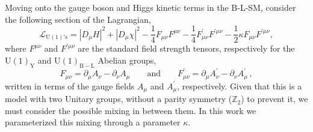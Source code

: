 \documentclass[10pt]{report}
\newcommand{\U}[1]{\mathrm{U}(1)_{\mathrm{#1}}}
\begin{document}
Moving onto the gauge boson and Higgs kinetic terms in the B-L-SM, consider the following section of the Lagrangian,
\begin{equation}
\mathcal{L}_{\mathrm{U(1)'s}} =  \left| D_\mu H \right|^2 + \left| D_\mu \chi \right|^2 -\dfrac{1}{4} F_{\mu \nu} F^{\mu \nu} -\dfrac{1}{4} F^\prime_{\mu \nu} F^{\prime \mu \nu} -\dfrac{1}{2} \kappa F_{\mu \nu} F^{\prime \mu \nu} , 
\label{eq:Lu1}
\end{equation}
where $F^{\mu \nu}$ and $F^{\prime \mu \nu}$ are the standard field strength tensors, respectively for the $\U{Y}$ and  $\U{B-L}$ Abelian groups, 
\begin{equation}
F_{\mu \nu} = \partial_\mu A_\nu - \partial_\nu A_\mu 
\qquad
\text{and}
\qquad
F^\prime_{\mu \nu} = \partial_\mu A^\prime_\nu - \partial_\nu A^\prime_\mu\,,
\label{eq:Fmn}
\end{equation}
written in terms of the gauge fields $A_\mu$ and $A_\mu^\prime$, respectively. Given that this is a model with two Unitary groups, without a parity symmetry ($\mathbb{Z}_2$) to prevent it, we must consider the possible mixing in between them. In this work we parameterized this mixing through a parameter $\kappa$.
\end{document}
